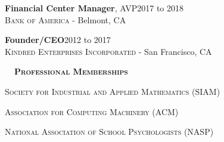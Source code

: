 \documentclass[hidelinks, 10pt]{article}
\def\contentspacing{2.5mm}          %
\def\sectionspacing{6mm}            %
\def\sectiontocontentspacing{4mm}   %
\renewcommand{\section}[1]{
    {\fontsize{14}{14}\selectfont \textsc{\textbf{\ \ #1\ \ }}}\hrulefill
}
\begin{document}
{\vspace{\contentspacing}

\begin{minipage}[ct]{0.9\linewidth}
    \textbf{Financial Center Manager}, AVP\hfill 2017 to 2018\\
    {\textsc{Bank of America} - Belmont, CA}
\end{minipage}

\vspace{\contentspacing}

\begin{minipage}[ct]{0.9\linewidth}
    \textbf{Founder/CEO}\hfill 2012 to 2017\\
    {\textsc{Kindred Enterprises Incorporated} - San Francisco, CA}
\end{minipage}



\vspace{\sectionspacing}


\section{Professional Memberships}
\vspace{\sectiontocontentspacing}

\begin{minipage}[ct]{0.9\linewidth}
    \textsc{Society for Industrial and Applied Mathematics} (SIAM)
\end{minipage}

\vspace{0.5mm}

\begin{minipage}[ct]{0.9\linewidth}
    \textsc{Association for Computing Machinery} (ACM)
\end{minipage}

\vspace{0.5mm}

\begin{minipage}[ct]{0.9\linewidth}
    \textsc{National Association of School Psychologists} (NASP)
\end{minipage}

}
\end{document}
